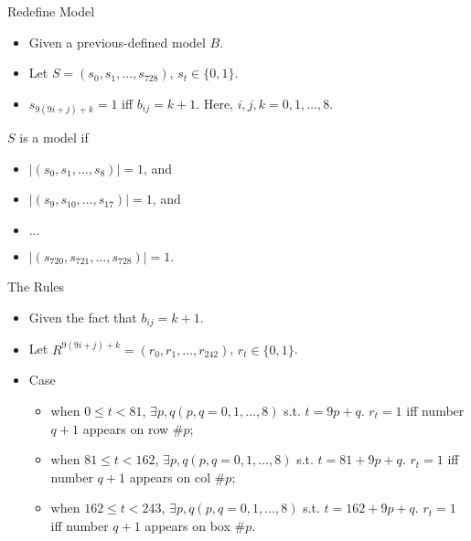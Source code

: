 \documentclass[11pt]{beamer}
\theoremstyle{definition}
\begin{document}
\begin{frame}{Redefine Model}
    \begin{itemize}
        \item Given a previous-defined model $B$.
        \item Let $S=(s_0, s_1, \ldots, s_{728})$, $s_t \in \{0, 1\}$.
        \item $s_{9(9i + j) + k} = 1$ iff $b_{ij} = k + 1$. Here, $i,j,k=0, 1, \ldots, 8$.
    \end{itemize}
    \begin{definition}
        $S$ is a model if
        \begin{itemize}
            \item $\lvert (s_0, s_1, \ldots, s_8) \rvert = 1$, and
            \item $\lvert (s_9, s_{10}, \ldots, s_{17}) \rvert = 1$, and
            \item $\ldots$
            \item $\lvert (s_{720}, s_{721}, \ldots, s_{728}) \rvert = 1$.
        \end{itemize}
    \end{definition}
\end{frame}

\begin{frame}{The Rules}
    \begin{itemize}
        \item Given the fact that $b_{ij}=k+1$.
        \item Let $R^{9(9i + j) + k}=(r_0, r_1, \ldots, r_{242})$, $r_t \in \{0, 1\}$.
        \item Case
        \begin{itemize}
            \item when $0 \le t < 81$, $\exists p, q (p,q=0,1,\ldots, 8)$ s.t. $t=9p+q$. $r_t=1$ iff number $q+1$ appears on row \#$p$;
            \item when $81 \le t < 162$, $\exists p, q (p,q=0,1,\ldots, 8)$ s.t. $t=81+9p+q$. $r_t=1$ iff number $q+1$ appears on col \#$p$;
            \item when $162 \le t < 243$, $\exists p, q (p,q=0,1,\ldots, 8)$ s.t. $t=162+9p+q$. $r_t=1$ iff number $q+1$ appears on box \#$p$.
        \end{itemize}
    \end{itemize}
\end{frame}
\end{document}
